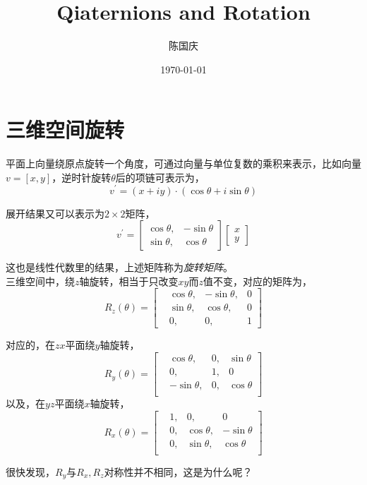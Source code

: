 \documentclass[hpyerref,UTF8,a4paper,titlepage,12pt,oneside]{ctexbook}
\title{Qiaternions and Rotation}
\author{陈国庆}
\date{\today}
\theoremstyle{definition}
\begin{document}
\maketitle

\section{三维空间旋转}

平面上向量绕原点旋转一个角度，可通过向量与单位复数的乘积来表示，比如向量$v= [x,y]$，逆时针旋转$\theta$后的项链可表示为，
$$
	v^\prime = (x + iy)\cdot (\cos \theta + i\sin\theta)
$$

展开结果又可以表示为$2\times 2$矩阵，
$$
	v^\prime = \begin{bmatrix}
		\cos\theta,& -\sin\theta\\
		\sin\theta,& \cos\theta
	\end{bmatrix}
	\begin{bmatrix}
		x\\
		y
	\end{bmatrix}
$$

这也是线性代数里的结果，上述矩阵称为\textit{旋转矩阵}。\\

三维空间中，绕$z$轴旋转，相当于只改变$xy$而$z$值不变，对应的矩阵为，
$$
	R_z(\theta) = \begin{bmatrix}
			&\cos\theta,&-\sin\theta, & 0\\
			&\sin\theta,&\cos\theta, &0\\
			&0,&0,&1
		\end{bmatrix}
$$

对应的，在$zx$平面绕$y$轴旋转，
$$
	R_y(\theta) = \begin{bmatrix}
			&\cos\theta,&0, &\sin\theta\\
			&0, &1,&0\\
			&-\sin\theta,&0,&\cos\theta\\
		\end{bmatrix}
$$
以及，在$yz$平面绕$x$轴旋转，
$$
	R_x(\theta) = \begin{bmatrix}
			&1,	&0,			&0\\
			&0, &\cos\theta,&-\sin\theta\\
			&0,	&\sin\theta,&\cos\theta\\
		\end{bmatrix}
$$
 
很快发现，$R_y$与$R_x,R_z$对称性并不相同，这是为什么呢？\\
\end{document}
